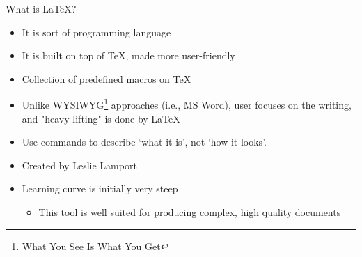 \documentclass{beamer}
\begin{document}

\begin{frame}{What is \LaTeX?}
\begin{itemize}
    \item It is sort of programming language
    \item It is built on top of \TeX{}, made more user-friendly
    \item Collection of predefined macros on \TeX
    \item Unlike WYSIWYG\footnote{What You See Is What You Get} approaches (i.e., MS Word), user focuses on the writing, and "heavy-lifting" is done by \LaTeX 
    \item Use commands to describe `what it is', not `how it looks'.
    \item Created by Leslie Lamport
    \item Learning curve is initially very steep
    \begin{itemize}
        \item This tool is well suited for producing complex, high quality documents
    \end{itemize}

\end{itemize}
\end{frame}
\end{document}
